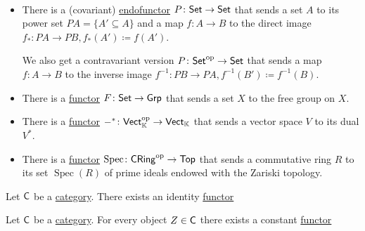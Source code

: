 \documentclass[../../main]{subfiles}
\begin{document}
\begin{example}~
  \begin{itemize}
    \item There is a (covariant) \hyperref[def:functor]{endofunctor} \(P\colon \mathsf{Set} \to \mathsf{Set}\) that sends a set \(A\) to its power set \(PA = \{ A' \subseteq A\}\) and a map \(f\colon A \to B\) to the direct image \(f_{\ast}\colon PA \to PB, f_{\ast}(A') \coloneq f(A')\).

          We also get a contravariant version \(P\colon \mathsf{Set}^{\operatorname*{op}} \to \mathsf{Set}\) that sends a map \(f\colon A \to B\) to the inverse image \(f^{-1}\colon PB \to PA, f^{-1}(B') \coloneq f^{-1}(B)\).
    \item There is a \hyperref[def:functor]{functor} \(F\colon \mathsf{Set} \to \mathsf{Grp}\) that sends a set \(X\) to the free group on \(X\).
    \item There is a \hyperref[def:functor]{functor} \(-^{\ast}\colon \mathsf{Vect}_{\mathbb{K}}^{\operatorname*{op}} \to \mathsf{Vect}_{\mathbb{K}}\) that sends a vector space \(V\) to its dual \(V^{\ast}\).
    \item There is a \hyperref[def:functor]{functor} \(\operatorname{Spec}\colon \mathsf{CRing}^{\operatorname*{op}} \to \mathsf{Top}\) that sends a commutative ring \(R\) to its set \(\operatorname{Spec}(R)\) of prime ideals endowed with the Zariski topology.
  \end{itemize}
\end{example}

\begin{example}\label{ex:identity-functor}
  Let \(\mathsf{C}\) be a \hyperref[def:category]{category}.
  There exists an identity \hyperref[def:functor]{functor}
  \begin{center}
  \end{center}
\end{example}

\begin{example}\label{ex:constant-functor}
  Let \(\mathsf{C}\) be a \hyperref[def:category]{category}.
  For every object \(Z \in \mathsf{C}\) there exists a constant \hyperref[def:functor]{functor}
  \begin{center}
  \end{center}
\end{example}
\end{document}
